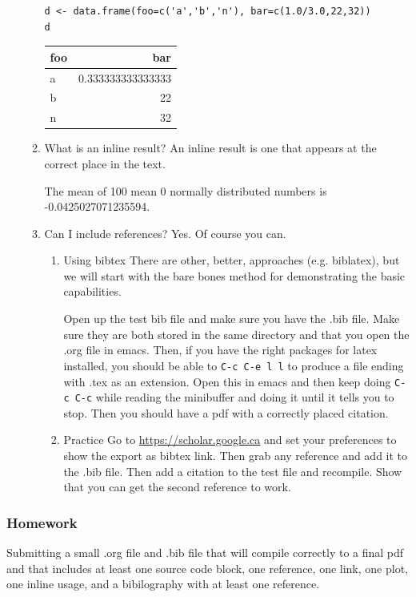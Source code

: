 \documentclass{article}
\begin{document}
\begin{enumerate}
\begin{enumerate}
\begin{verbatim}
d <- data.frame(foo=c('a','b','n'), bar=c(1.0/3.0,22,32))
d
\end{verbatim}

\begin{center}
\begin{tabular}{lr}
foo & bar\\
\hline
a & 0.333333333333333\\
b & 22\\
n & 32\\
\end{tabular}
\end{center}

\item What is an inline result?
\label{sec:org32d3276}
An inline result is one that appears at the correct place in the text. 

The mean of 100 mean 0 normally distributed numbers is -0.0425027071235594.

\item Can I include references?
\label{sec:org587ef33}
Yes. Of course you can. 

\begin{enumerate}
\item Using bibtex
\label{sec:org0381965}
There are other, better, approaches (e.g. biblatex), but we will start with the bare bones method for demonstrating the basic capabilities.

Open up the test bib file and make sure you have the .bib file. Make sure they are both stored in the same directory and that you open the .org file in emacs. Then, if you have the right packages for latex installed, you should be able to \texttt{C-c C-e l l} to produce a file ending with .tex as an extension. Open this in emacs and then keep doing \texttt{C-c C-c} while reading the minibuffer and doing it until it tells you to stop. Then you should have a pdf with a correctly placed citation. 


\item Practice
\label{sec:org4cc3a75}
Go to \url{https://scholar.google.ca} and set your preferences to show the export as bibtex link. Then grab any reference and add it to the .bib file. Then add a citation to the test file and recompile. Show that you can get the second reference to work.
\end{enumerate}
\end{enumerate}
\end{enumerate}


\subsubsection{Homework}
\label{sec:org0e31db9}
Submitting a small .org file and .bib file that will compile correctly to a final pdf and that includes at least one source code block, one reference, one link, one plot, one inline usage, and a bibilography with at least one reference. 
\end{document}
